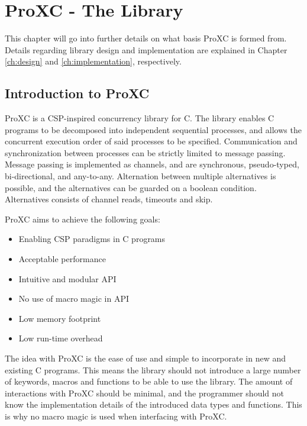
\chapter{ProXC - The Library}
\label{ch:proxc_library}

This chapter will go into further details on what basis ProXC is formed from. Details regarding library design and implementation are explained in Chapter \ref{ch:design} and \ref{ch:implementation}, respectively. 


\section{Introduction to ProXC}
\label{sec:proxc_intro}

ProXC is a CSP\hyp{}inspired concurrency library for C. The library enables C programs to be decomposed into independent sequential processes, and allows the concurrent execution order of said processes to be specified. Communication and synchronization between processes can be strictly lim\-ited to message passing. Message passing is implemented as channels, and are synch\-ronous, pseudo\hyp{}typed, bi\hyp{}directional, and any\hyp{}to\hyp{}any. Alternation between multiple alternatives is possible, and the alternatives can be guarded on a boolean condition. Alternatives consists of channel reads, timeouts and skip. 

ProXC aims to achieve the following goals:
\begin{itemize}[topsep=0em,itemsep=-1em,partopsep=-1em,parsep=1em]
    \item Enabling CSP paradigms in C programs
    \item Acceptable performance
    \item Intuitive and modular API
    \item No use of macro magic in API
    \item Low memory footprint
    \item Low run\hyp{}time overhead
\end{itemize}

The idea with ProXC is the ease of use and simple to incorporate in new and existing C programs. This means the library should not introduce a large number of keywords, macros and functions to be able to use the library. The amount of interactions with ProXC should be minimal, and the programmer should not know the implementation details of the introduced data types and functions. This is why no macro magic is used when interfacing with ProXC. 

